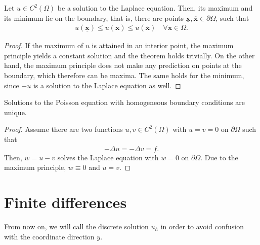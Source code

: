 \begin{corollary}
  Let $u \in C^2(\Omega)$ be a solution to the Laplace equation. Then,
  its maximum and its minimum lie on the boundary, that is, there are
  points
  $\underline{\mathbf x}, \overline{\mathbf x} \in\partial\Omega$,
  such that
  \begin{gather*}
    u(\underline{\mathbf x}) \le u(\mathbf x)
    \le u(\overline{\mathbf x})
    \quad\forall \mathbf x\in\Omega.
  \end{gather*}
\end{corollary}

\begin{proof}
  If the maximum of $u$ is attained in an interior point, the maximum
  principle yields a constant solution and the theorem holds
  trivially. On the other hand, the maximum principle does not make
  any prediction on points at the boundary, which therefore can be
  maxima. The same holds for the minimum, since $-u$ is a solution to
  the Laplace equation as well.
\end{proof}

\begin{corollary}
  Solutions to the Poisson equation with homogeneous boundary
  conditions are unique.
\end{corollary}

\begin{proof}
  Assume there are two functions $u,v\in C^2(\Omega)$ with $u=v=0$ on
  $\partial\Omega$ such that
  \begin{gather*}
    -\Delta u = -\Delta v = f.
  \end{gather*}
  Then, $w=u-v$ solves the Laplace equation with $w=0$ on
  $\partial\Omega$. Due to the maximum principle, $w \equiv 0$ and
  $u=v$.
\end{proof}


\section{Finite differences}






\begin{remark}
  From now on, we will call the discrete solution $u_h$ in order to
  avoid confusion with the coordinate direction $y$.
\end{remark}



